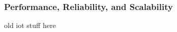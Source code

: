 \renewcommand{\imgpath}{legacy/old-iot/img}

\subsubsection{Performance, Reliability, and Scalability}
old iot stuff here
